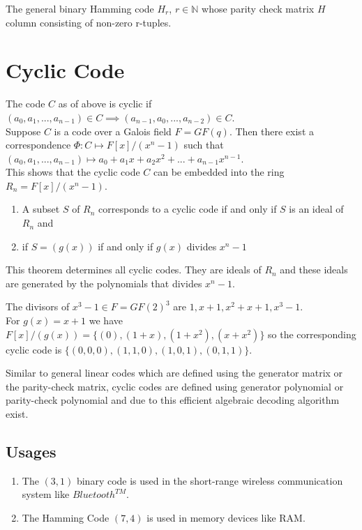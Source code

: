 \begin{example}
  The general binary Hamming code \(H_r\), \(r \in \mathbb{N}\) whose parity check matrix \(H\) column consisting of non-zero r-tuples.
\end{example}

\section{Cyclic Code}
The code \(C\) as of above is cyclic if \((a_0,a_1,...,a_{n-1}) \in C \implies (a_{n-1},a_0,...,a_{n-2}) \in C\).\\

Suppose \(C\) is a code over a Galois field \(F=GF(q)\). Then there exist a correspondence \(\Phi : C \mapsto F[x]/(x^n-1)\) such that \((a_0,a_1,...,a_{n-1})\longmapsto a_0+a_1x+a_2x^2+...+a_{n-1}x^{n-1}\).\\
This shows that the cyclic code \(C\) can be embedded into the ring \(R_n=F[x]/(x^n-1)\).

\begin{theorem}
  \begin{enumerate}
  \item A subset \(S\) of \(R_n\) corresponds to a cyclic code if and only if \(S\) is an ideal of \(R_n\) and
  \item if \(S=(g(x))\) if and only if  \(g(x)\) divides \(x^n-1\)
  \end{enumerate}
\end{theorem}

This theorem determines all cyclic codes. They are ideals of \(R_n\) and these ideals are generated by the polynomials that divides \(x^n-1\).

\begin{example}
  The divisors of \(x^3-1 \in F=GF(2)^{3}\) are \(1, x+1, x^2+x+1, x^3-1\).\\
  For \(g(x)=x+1\) we have \(F[x]/(g(x))=\{(0),(1+x),(1+x^2),(x+x^2)\}\) so the corresponding cyclic code is \(\{(0,0,0),(1,1,0),(1,0,1),(0,1,1)\}\).
\end{example}

\vspace{5mm}
Similar to general linear codes which are defined using the generator matrix or the parity-check matrix, cyclic codes are defined using generator polynomial or parity-check polynomial and due to this efficient algebraic decoding algorithm exist.

\subsection{Usages}
\begin{enumerate}
\item The \((3,1)\) binary code is used in the short-range wireless communication system like \(Bluetooth^{TM}\).
  \item The Hamming Code \((7,4)\) is used in memory devices like RAM.
\end{enumerate}

